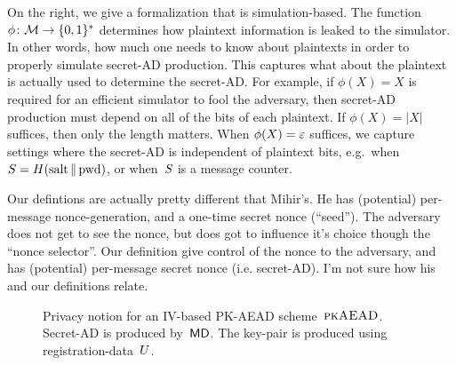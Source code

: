   On the right, we give a formalization that is simulation-based.  The function~$\phi\colon\mathcal{M}\to\{0,1\}^*$ determines how plaintext information is leaked to the simulator.  In other words, how much one needs to know about plaintexts in order to properly simulate secret-AD production.  This captures what about the plaintext is actually used to determine the secret-AD. For example, if $\phi(X)=X$ is required for an efficient simulator to fool the adversary, then secret-AD production must depend on all of the bits of each plaintext.  If $\phi(X)=|X|$ suffices, then only the length matters.  When $\phi(X)=\varepsilon$ suffices, we capture settings where the secret-AD is independent of plaintext bits, e.g.\ when~$S = H(\mathrm{salt} \,\|\, \mathrm{pwd})$, or when~$S$ is a message counter.


Our defintions are actually pretty different that Mihir's.  He has (potential) per-message nonce-generation, and a one-time secret nonce (``seed'').  The adversary does not get to see the nonce, but does got to influence it's choice though the ``nonce selector''.  Our definition give control of the nonce to the adversary, and has (potential) per-message secret nonce (i.e. secret-AD).  I'm not sure how his and our definitions relate.

\begin{figure}
\begin{center}
\caption{Privacy notion for an IV-based PK-AEAD
  scheme~$\textsc{pkAEAD}$.  Secret-AD is produced by~$\mathsf{MD}$.  The key-pair
  is produced using registration-data~$U$.} 
\label{fig:pkaead-notions}
\end{center}
\end{figure}

